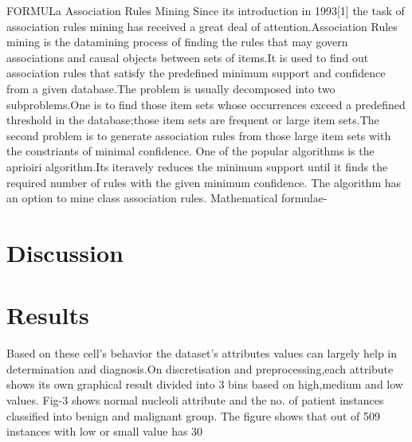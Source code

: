 \documentclass[11pt]{article}
\begin{document}
FORMULa
Association Rules Mining
Since its introduction in 1993[1] the task of association rules mining has received a great deal of attention.Association Rules mining is the datamining process of finding the rules that may govern associations and causal objects between sets of items.It is used to find out association rules that satisfy the predefined minimum support and confidence from a given database.The problem is usually decomposed into two subproblems.One is to find those item sets whose occurrences exceed a predefined threshold in the database;those item sets are frequent or large item sets.The second problem is to generate association rules from those large item sets with the constriants of minimal confidence.
One of the popular algorithms is the aprioiri algorithm.Its iteravely reduces the minimum support until it finds the required number of rules with the given minimum confidence.
The algorithm has an option to mine class association rules.
Mathematical formulae-   
 


\section{Discussion}

 
\section{Results}


Based on these cell's behavior the dataset's attributes values can largely help in determination and diagnosis.On discretisation and preprocessing,each attribute shows its own graphical result divided into 3 bins based on high,medium and low values. Fig-3 shows normal nucleoli attribute and the no. of patient instances classified into benign and malignant group. The figure shows that out of 509 instances with low or small value has 30%
\end{document}
